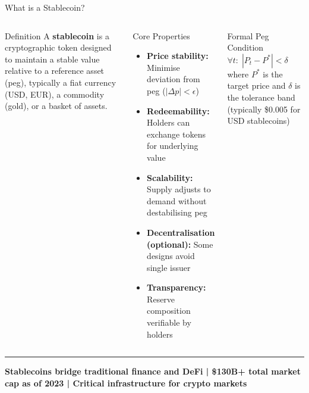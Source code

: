 \documentclass[8pt,aspectratio=169]{beamer}
\newcommand{\bottomnote}[1]{\vfill\vspace{-2mm}\textcolor{mllavender2}{\rule{\textwidth}{0.4pt}}\vspace{1mm}\footnotesize\textbf{#1}}
\begin{document}
\begin{frame}{What is a Stablecoin?}
\begin{columns}[T]
\begin{block}{Definition}
A \textbf{stablecoin} is a cryptographic token designed to maintain a stable value relative to a reference asset (peg), typically a fiat currency (USD, EUR), a commodity (gold), or a basket of assets.
\end{block}
\vspace{2mm}
\begin{block}{Core Properties}
\begin{itemize}\setlength{\itemsep}{2pt}
  \item \textbf{Price stability:} Minimise deviation from peg ($|\Delta p| < \epsilon$)
  \item \textbf{Redeemability:} Holders can exchange tokens for underlying value
  \item \textbf{Scalability:} Supply adjusts to demand without destabilising peg
  \item \textbf{Decentralisation (optional):} Some designs avoid single issuer
  \item \textbf{Transparency:} Reserve composition verifiable by holders
\end{itemize}
\end{block}
\vspace{2mm}
\begin{alertblock}{Formal Peg Condition}
\scriptsize $\forall t:\; |P_t - P^* | < \delta$ \quad where $P^*$ is the target price and $\delta$ is the tolerance band (typically \$0.005 for USD stablecoins)
\end{alertblock}
\end{columns}
\bottomnote{Stablecoins bridge traditional finance and DeFi | \$130B+ total market cap as of 2023 | Critical infrastructure for crypto markets}
\end{frame}
\end{document}
